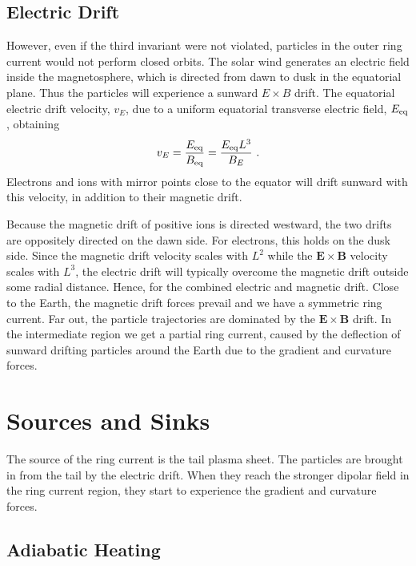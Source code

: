 \documentclass[12pt,a4paper]{article}
\renewcommand{\vec}[1]{\boldsymbol{#1}}
\begin{document}
\subsection{Electric Drift}
However, even if the third invariant were not violated, particles in the outer ring current would not perform closed orbits. The solar wind generates an electric field inside the magnetosphere, which is directed from dawn to dusk in the equatorial plane. Thus the particles will experience a sunward $E \times B$ drift. The equatorial electric drift velocity, $v_E$, due to a uniform equatorial transverse electric field, $E_{\rm eq}$, obtaining
\begin{equation}
v_E = \dfrac{E_{\rm eq}}{B_{\rm eq}} = \dfrac{E_{\rm eq} L^3}{B_E} ~.
\end{equation}
Electrons and ions with mirror points close to the equator will drift sunward with this velocity, in addition to their magnetic drift.

Because the magnetic drift of positive ions is directed westward, the two drifts are oppositely directed on the dawn side. For electrons, this holds on the dusk side. Since the magnetic drift velocity scales with $L^2$ while the $\vec{E} \times \vec{B}$ velocity scales with $L^3$, the electric drift will typically overcome the magnetic drift outside some radial distance. Hence, for the combined electric and magnetic drift. Close to the Earth, the magnetic drift forces prevail and we have a symmetric ring current. Far out, the particle trajectories are dominated by the $\vec{E} \times \vec{B}$ drift. In the intermediate region we get a partial ring current, caused by the deflection of sunward drifting particles around the Earth due to the gradient and curvature forces.

\section{Sources and Sinks}
The source of the ring current is the tail plasma sheet. The particles are brought in from the tail by the electric drift. When they reach the stronger dipolar field in the ring current region, they start to experience the gradient and curvature forces.

\subsection{Adiabatic Heating}
\end{document}
